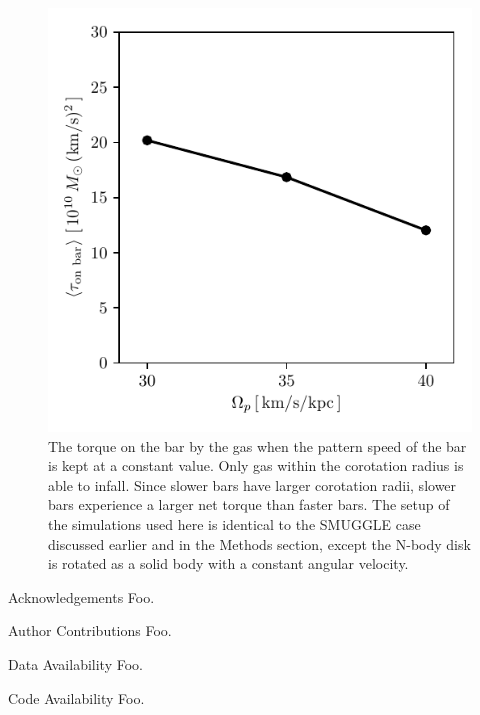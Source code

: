 \documentclass{natureprintstyle}
\begin{document}
\begin{figure}[h]
\centering
\includegraphics{fig/fig4.pdf}
\caption{The torque on the bar by the gas when the pattern speed of the bar is
kept at a constant value. Only gas within the corotation radius is able to
infall. Since slower bars have larger corotation radii, slower bars experience
a larger net torque than faster bars. The setup of the simulations used here
is identical to the SMUGGLE case discussed earlier and in the Methods section,
except the N-body disk is rotated as a solid body with a constant angular
velocity.}\label{fig:equil}
\end{figure}





\begin{addendum}
  
\item [Acknowledgements] Foo.

\item[Author Contributions] Foo.

  \item[Data Availability] Foo.
    
  \item[Code Availability] Foo.
    
\end{addendum}
\end{document}
